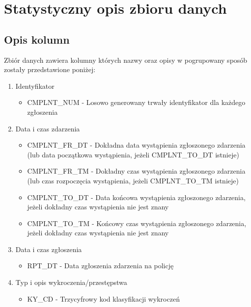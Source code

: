 \documentclass{classrep}
\begin{document}
    \section{Statystyczny opis zbioru danych} \label{dataset_description} {
        \subsection{Opis kolumn} {
            Zbiór danych zawiera kolumny których nazwy oraz opisy w pogrupowany sposób
            zostały przedstawione poniżej:
            \begin{enumerate}
                \item Identyfikator
                \begin{itemize}
                    \item CMPLNT\_NUM - Losowo generowany trwały identyfikator dla każdego zgłoszenia
                \end{itemize}
                \item Data i czas zdarzenia
                \begin{itemize}
                    \item CMPLNT\_FR\_DT - Dokładna data wystąpienia zgłoszonego zdarzenia (lub data początkowa wystąpienia, jeżeli CMPLNT\_TO\_DT istnieje)
                    \item CMPLNT\_FR\_TM - Dokładny czas wystąpienia zgłoszonego zdarzenia (lub czas rozpoczęcia wystąpienia, jeżeli CMPLNT\_TO\_TM istnieje)
                    \item CMPLNT\_TO\_DT - Data końcowa wystąpienia zgłoszonego zdarzenia, jeżeli dokładny czas wystąpienia nie jest znany
                    \item CMPLNT\_TO\_TM - Końcowy czas wystąpienia zgłoszonego zdarzenia, jeżeli dokładny czas wystąpienia nie jest znany
                \end{itemize}
                \item Data i czas zgłoszenia
                \begin{itemize}
                    \item RPT\_DT - Data zgłoszenia zdarzenia na policję
                \end{itemize}
                \item Typ i opis wykroczenia/przestępstwa
                \begin{itemize}
                    \item KY\_CD - Trzycyfrowy kod klasyfikacji wykroczeń

\end{itemize}
\end{enumerate}}}
\end{document}
